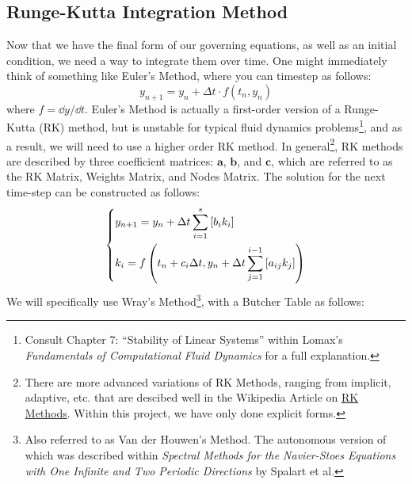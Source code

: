 \documentclass[12pt, reqno]{amsart}
\begin{document}
\subsection{Runge-Kutta Integration Method}
Now that we have the final form of our governing equations, as well as an initial condition, we need a way to integrate them over time. One might immediately think of something like Euler's Method, where you can timestep as follows:
\begin{equation}
    y_{n + 1} = y_n + \Delta t \cdot f(t_n, y_n)
\end{equation}
where $f = \dd y/ \dd t$. Euler's Method is actually a first-order version of a Runge-Kutta (RK) method, but is unstable for typical fluid dynamics problems\footnote{Consult Chapter 7: ``Stability of Linear Systems'' within Lomax's \textit{Fundamentals of Computational Fluid Dynamics} for a full explanation.}, and as a result, we will need to use a higher order RK method. In general\footnote{There are more advanced variations of RK Methods, ranging from implicit, adaptive, etc. that are descibed well in the Wikipedia Article on \href{https://en.wikipedia.org/wiki/Runge\%E2\%80\%93Kutta_methods}{RK Methods}. Within this project, we have only done explicit forms.}, RK methods are described by three coefficient matrices: $\mathbf{a}$, $\mathbf{b}$, and $\mathbf{c}$, which are referred to as the RK Matrix, Weights Matrix, and Nodes Matrix. The solution for the next time-step can be constructed as follows: 
\begin{equation}
    \begin{dcases}
        y_{n+1} = y_n + \Delta t \sum_{i = 1}^s \left[ b_i k_i \right] \\
        k_i = f \left(t_n + c_i \Delta t, y_n + \Delta t \sum_{j = 1}^{i - 1} \left[ a_{ij} k_j \right] \right)
    \end{dcases}
\end{equation}
We will specifically use  Wray's Method\footnote{Also referred to as Van der Houwen's Method. The autonomous version of which was described within \textit{Spectral Methods for the Navier-Stoes Equations with One Infinite and Two Periodic Directions} by Spalart et al.}, with a Butcher Table as follows:
\end{document}
